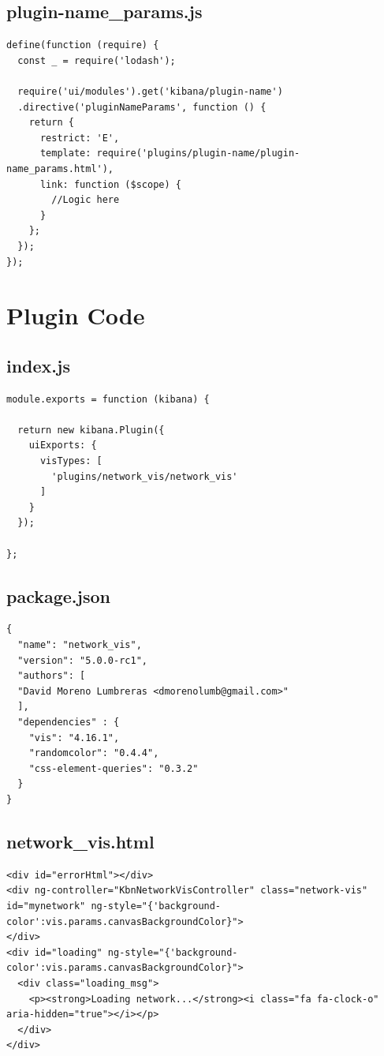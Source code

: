 \documentclass[a4paper, 12pt]{book}
\begin{document}
\subsection{plugin-name\_params.js}
\label{sec:pluginnameparamsjs}

\begin{lstlisting}[frame=single]
define(function (require) {
  const _ = require('lodash');

  require('ui/modules').get('kibana/plugin-name')
  .directive('pluginNameParams', function () {
    return {
      restrict: 'E',
      template: require('plugins/plugin-name/plugin-name_params.html'),
      link: function ($scope) {
        //Logic here
      }
    };
  });
});
\end{lstlisting}

\section{Plugin Code}
\label{sec:plugincode}

\subsection{index.js}

 \begin{lstlisting}[frame=single]
module.exports = function (kibana) {

  return new kibana.Plugin({
    uiExports: {
      visTypes: [
        'plugins/network_vis/network_vis'
      ]
    }
  });

};
\end{lstlisting}

\subsection{package.json}

 \begin{lstlisting}[frame=single]
{
  "name": "network_vis",
  "version": "5.0.0-rc1",
  "authors": [
  "David Moreno Lumbreras <dmorenolumb@gmail.com>"
  ],
  "dependencies" : {
    "vis": "4.16.1",
    "randomcolor": "0.4.4",
    "css-element-queries": "0.3.2"
  }
}
\end{lstlisting}

\subsection{network\_vis.html}

 \begin{lstlisting}[frame=single]
<div id="errorHtml"></div>
<div ng-controller="KbnNetworkVisController" class="network-vis" id="mynetwork" ng-style="{'background-color':vis.params.canvasBackgroundColor}">
</div>
<div id="loading" ng-style="{'background-color':vis.params.canvasBackgroundColor}">
  <div class="loading_msg">
    <p><strong>Loading network...</strong><i class="fa fa-clock-o" aria-hidden="true"></i></p>
  </div>
</div>
\end{lstlisting}
\end{document}
